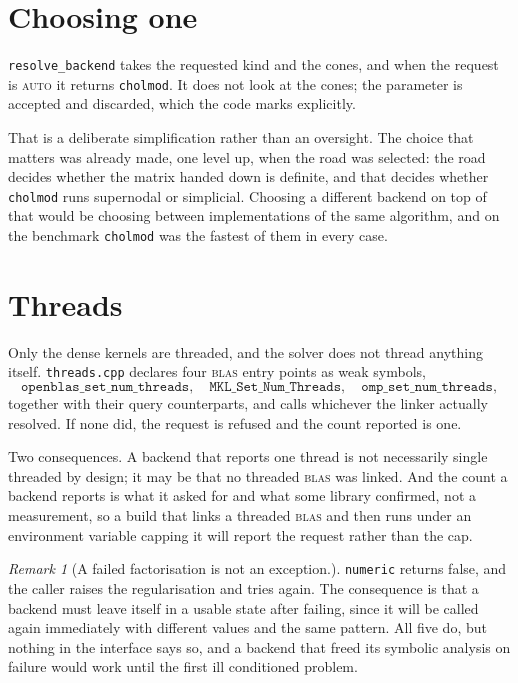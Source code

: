 \documentclass[a4paper,11pt]{book}
\theoremstyle{plain}
\theoremstyle{definition}
\theoremstyle{remark}
\newtheorem{remark}[theorem]{Remark}
\numberwithin{equation}{chapter}
\numberwithin{algorithm}{chapter}
\begin{document}
	\section{Choosing one}

	\texttt{resolve\_backend} takes the requested kind and the cones, and when the
	request is \textsc{auto} it returns \texttt{cholmod}. It does not look at the
	cones; the parameter is accepted and discarded, which the code marks
	explicitly.

	That is a deliberate simplification rather than an oversight. The choice that
	matters was already made, one level up, when the road was selected: the road
	decides whether the matrix handed down is definite, and that decides whether
	\texttt{cholmod} runs supernodal or simplicial. Choosing a different backend
	on top of that would be choosing between implementations of the same
	algorithm, and on the benchmark \texttt{cholmod} was the fastest of them in
	every case.

	\section{Threads}

	Only the dense kernels are threaded, and the solver does not thread anything
	itself. \texttt{threads.cpp} declares four \textsc{blas} entry points as weak
	symbols,
	\[
	\texttt{openblas\_set\_num\_threads},\quad
	\texttt{MKL\_Set\_Num\_Threads},\quad
	\texttt{omp\_set\_num\_threads},
	\]
	together with their query counterparts, and calls whichever the linker
	actually resolved. If none did, the request is refused and the count reported
	is one.

	Two consequences. A backend that reports one thread is not necessarily
	single threaded by design; it may be that no threaded \textsc{blas} was
	linked. And the count a backend reports is what it asked for and what some
	library confirmed, not a measurement, so a build that links a threaded
	\textsc{blas} and then runs under an environment variable capping it will
	report the request rather than the cap.


	\begin{remark}[A failed factorisation is not an exception.]
		\texttt{numeric} returns false, and the caller raises the regularisation
		and tries again. The consequence is that a backend must leave itself in a
		usable state after failing, since it will be called again immediately with
		different values and the same pattern. All five do, but nothing in the
		interface says so, and a backend that freed its symbolic analysis on
		failure would work until the first ill conditioned problem.
	\end{remark}
\end{document}
